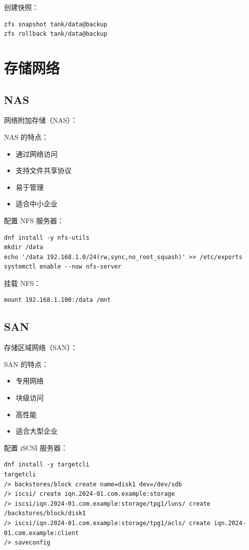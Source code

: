 \documentclass[12pt,UTF8]{ctexbook}
\begin{document}
创建快照：
\begin{verbatim}
zfs snapshot tank/data@backup
zfs rollback tank/data@backup
\end{verbatim}

\chapter{存储网络}
\label{chap:storage_network}

\section{NAS}
\label{sec:nas}

网络附加存储（NAS）：

NAS 的特点：
\begin{itemize}
    \item 通过网络访问
    \item 支持文件共享协议
    \item 易于管理
    \item 适合中小企业
\end{itemize}

配置 NFS 服务器：
\begin{verbatim}
dnf install -y nfs-utils
mkdir /data
echo '/data 192.168.1.0/24(rw,sync,no_root_squash)' >> /etc/exports
systemctl enable --now nfs-server
\end{verbatim}

挂载 NFS：
\begin{verbatim}
mount 192.168.1.100:/data /mnt
\end{verbatim}

\section{SAN}
\label{sec:san}

存储区域网络（SAN）：

SAN 的特点：
\begin{itemize}
    \item 专用网络
    \item 块级访问
    \item 高性能
    \item 适合大型企业
\end{itemize}

配置 iSCSI 服务器：
\begin{verbatim}
dnf install -y targetcli
targetcli
/> backstores/block create name=disk1 dev=/dev/sdb
/> iscsi/ create iqn.2024-01.com.example:storage
/> iscsi/iqn.2024-01.com.example:storage/tpg1/luns/ create /backstores/block/disk1
/> iscsi/iqn.2024-01.com.example:storage/tpg1/acls/ create iqn.2024-01.com.example:client
/> saveconfig
\end{verbatim}
\end{document}
